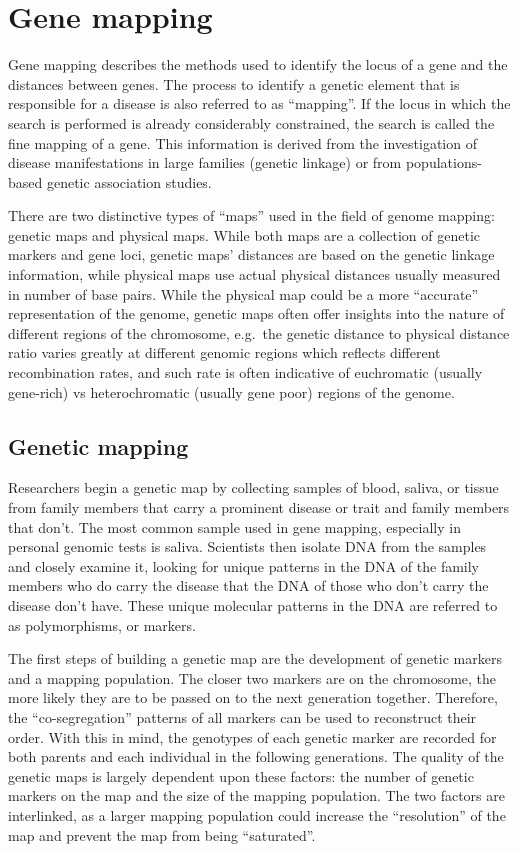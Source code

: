 \hypertarget{gene-mapping}{%
\section{Gene mapping}\label{gene-mapping}}

Gene mapping describes the methods used to identify the locus of a gene and the distances between genes. The process to identify a genetic element that is responsible for a disease is also referred to as ``mapping''. If the locus in which the search is performed is already considerably constrained, the search is called the fine mapping of a gene. This information is derived from the investigation of disease manifestations in large families (genetic linkage) or from populations-based genetic association studies.

There are two distinctive types of ``maps'' used in the field of genome mapping: genetic maps and physical maps. While both maps are a collection of genetic markers and gene loci, genetic maps' distances are based on the genetic linkage information, while physical maps use actual physical distances usually measured in number of base pairs. While the physical map could be a more ``accurate'' representation of the genome, genetic maps often offer insights into the nature of different regions of the chromosome, e.g.~the genetic distance to physical distance ratio varies greatly at different genomic regions which reflects different recombination rates, and such rate is often indicative of euchromatic (usually gene-rich) vs heterochromatic (usually gene poor) regions of the genome.

\hypertarget{genetic-mapping}{%
\subsection{Genetic mapping}\label{genetic-mapping}}

Researchers begin a genetic map by collecting samples of blood, saliva, or tissue from family members that carry a prominent disease or trait and family members that don't. The most common sample used in gene mapping, especially in personal genomic tests is saliva. Scientists then isolate DNA from the samples and closely examine it, looking for unique patterns in the DNA of the family members who do carry the disease that the DNA of those who don't carry the disease don't have. These unique molecular patterns in the DNA are referred to as polymorphisms, or markers.

The first steps of building a genetic map are the development of genetic markers and a mapping population. The closer two markers are on the chromosome, the more likely they are to be passed on to the next generation together. Therefore, the ``co-segregation'' patterns of all markers can be used to reconstruct their order. With this in mind, the genotypes of each genetic marker are recorded for both parents and each individual in the following generations. The quality of the genetic maps is largely dependent upon these factors: the number of genetic markers on the map and the size of the mapping population. The two factors are interlinked, as a larger mapping population could increase the ``resolution'' of the map and prevent the map from being ``saturated''.

